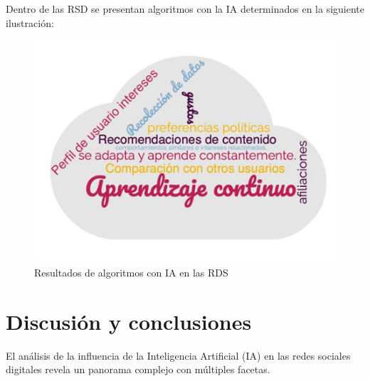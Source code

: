 \documentclass[runningheads]{llncs}
\begin{document}
Dentro de las RSD se presentan algoritmos con la IA determinados en la siguiente 
ilustración:

\begin{figure}[h!]
            \centering
            \includegraphics[width=0.5\linewidth]{ia.png}
            \caption{Resultados de algoritmos con IA en las RDS}
            \label{fig:enter-label}
\end{figure}
\section{Discusión y conclusiones}
El análisis de la influencia de la Inteligencia Artificial (IA) en las redes sociales digitales revela un panorama complejo con múltiples facetas.
\end{document}

